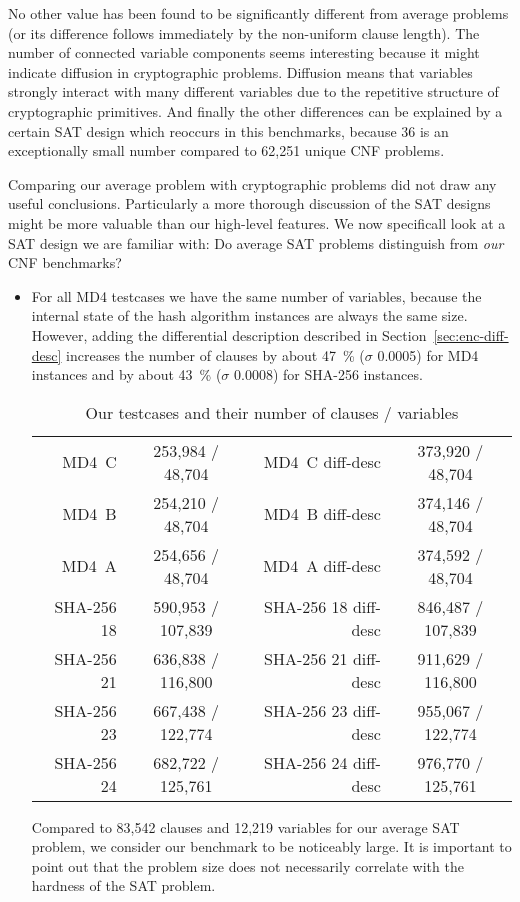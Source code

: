 No other value has been found to be significantly different from
average problems (or its difference follows immediately by the
non-uniform clause length). The number of connected variable
components seems interesting because it might indicate diffusion
in cryptographic problems. Diffusion means that variables strongly
interact with many different variables due to the repetitive
structure of cryptographic primitives. And finally the other
differences can be explained by a certain SAT design which
reoccurs in this benchmarks, because 36 is an exceptionally small
number compared to 62,251 unique CNF problems.

Comparing our average problem with cryptographic problems did
not draw any useful conclusions. Particularly a more thorough discussion
of the SAT designs might be more valuable than our high-level features.
We now specificall look at a SAT design we are familiar with:
Do average SAT problems distinguish from \emph{our} CNF benchmarks?

\begin{itemize}
  \item For all MD4 testcases we have the same number of variables,
    because the internal state of the hash algorithm instances are
    always the same size.
    However, adding the differential description described in
    Section~\ref{sec:enc-diff-desc} increases the number of clauses
    by about 47~\% ($\sigma$ 0.0005) for MD4 instances and
    by about 43~\% ($\sigma$ 0.0008) for SHA-256 instances.

    \begin{table}[!h]
      \begin{center}
        \begin{tabular}{rc|rc}
          MD4~C & 253,984 / 48,704 & MD4~C diff-desc & 373,920 / 48,704 \\
          MD4~B & 254,210 / 48,704 & MD4~B diff-desc & 374,146 / 48,704 \\
          MD4~A & 254,656 / 48,704 & MD4~A diff-desc & 374,592 / 48,704 \\
          SHA-256 18 & 590,953 / 107,839 & SHA-256 18 diff-desc & 846,487 / 107,839 \\
          SHA-256 21 & 636,838 / 116,800 & SHA-256 21 diff-desc & 911,629 / 116,800 \\
          SHA-256 23 & 667,438 / 122,774 & SHA-256 23 diff-desc & 955,067 / 122,774 \\
          SHA-256 24 & 682,722 / 125,761 & SHA-256 24 diff-desc & 976,770 / 125,761
        \end{tabular}
        \caption{Our testcases and their number of clauses / variables}
      \end{center}
    \end{table}

    Compared to 83,542 clauses and 12,219 variables for our average SAT problem,
    we consider our benchmark to be noticeably large. It is important to
    point out that the problem size does not necessarily correlate with
    the hardness of the SAT problem.
\end{itemize}

